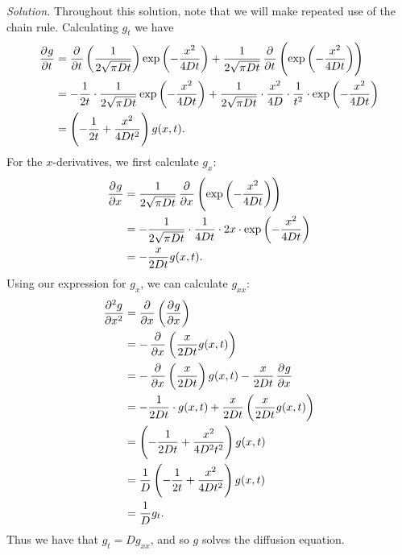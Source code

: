 \documentclass{article}
\begin{document}
\textit{Solution.}
Throughout this solution, note that we will make repeated use of the chain rule.
Calculating $g_t$ we have
%
\begin{align*}
    \dpd{g}{t}
        &=
        \dpd{}{t} \del{\frac{1}{2 \sqrt{\pi D t}}} \exp \del[3]{- \frac{x^2}{4 D t}}
        +
        \frac{1}{2 \sqrt{\pi D t}} \dpd{}{t} \del{\exp \del[3]{- \frac{x^2}{4 D t}}}
        \\
        &=
        -
        \frac{1}{2 t} \cdot \frac{1}{2 \sqrt{\pi D t}} \exp \del[3]{- \frac{x^2}{4 D t}}
        +
        \frac{1}{2 \sqrt{\pi D t}} \cdot \frac{x^2}{4D} \cdot \frac{1}{t^2} \cdot \exp \del[3]{- \frac{x^2}{4 D t}}
        \\
        &=
        \del{- \frac{1}{2 t} + \frac{x^2}{4Dt^2}} g(x, t)
        .
\end{align*}
%
For the $x$-derivatives, we first calculate $g_x$:
%
\begin{align*}
    \dpd{g}{x}
        &= \frac{1}{2 \sqrt{\pi D t}} \dpd{}{x} \del{\exp \del[3]{- \frac{x^2}{4 D t}}}
        \\
        &= - \frac{1}{2 \sqrt{\pi D t}} \cdot \frac{1}{4Dt} \cdot 2 x \cdot \exp \del[3]{- \frac{x^2}{4 D t}}
        \\
        &= - \frac{x}{2Dt} g(x, t)
        .
\end{align*}
%
Using our expression for $g_x$, we can calculate $g_{xx}$:
%
\begin{align*}
    \dpd[2]{g}{x}
        &= \dpd{}{x} \del{\dpd{g}{x}}
        \\
        &= - \dpd{}{x} \del{\frac{x}{2Dt} g(x, t)}
        \\
        &=
        -
        \dpd{}{x} \del{\frac{x}{2Dt}} g(x, t)
        -
        \frac{x}{2Dt} \dpd{g}{x}
        \\
        &=
        -
        \frac{1}{2Dt} \cdot g(x, t)
        +
        \frac{x}{2Dt} \del{\frac{x}{2Dt} g(x, t)}
        \\
        &=
        \del{- \frac{1}{2 D t} + \frac{x^2}{4 D^2 t^2}} g(x, t)
        \\
        &=
        \frac{1}{D} \del{- \frac{1}{2 t} + \frac{x^2}{4 D t^2}} g(x, t)
        \\
        &=
        \frac{1}{D} g_t
        .
\end{align*}
%
Thus we have that $g_t = D g_{xx}$, and so $g$ solves the diffusion equation.

\vspace{5mm}
\end{document}

